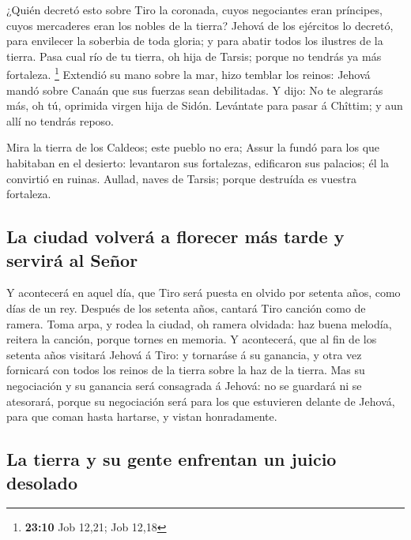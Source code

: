  ¿Quién decretó esto sobre Tiro la coronada, cuyos
negociantes eran príncipes, cuyos mercaderes eran los nobles de la
tierra?  Jehová de los ejércitos lo decretó, para envilecer
la soberbia de toda gloria; y para abatir todos los ilustres de la
tierra.  Pasa cual río de tu tierra, oh hija de Tarsis;
porque no tendrás ya más fortaleza. \footnote{\textbf{23:10} Job 12,21;
  Job 12,18}  Extendió su mano sobre la mar, hizo temblar
los reinos: Jehová mandó sobre Canaán que sus fuerzas sean debilitadas.
 Y dijo: No te alegrarás más, oh tú, oprimida virgen hija
de Sidón. Levántate para pasar á Chîttim; y aun allí no tendrás reposo.

 Mira la tierra de los Caldeos; este pueblo no era; Assur
la fundó para los que habitaban en el desierto: levantaron sus
fortalezas, edificaron sus palacios; él la convirtió en ruinas.
 Aullad, naves de Tarsis; porque destruída es vuestra
fortaleza.

\hypertarget{la-ciudad-volveruxe1-a-florecer-muxe1s-tarde-y-serviruxe1-al-seuxf1or}{%
\subsection{La ciudad volverá a florecer más tarde y servirá al
Señor}\label{la-ciudad-volveruxe1-a-florecer-muxe1s-tarde-y-serviruxe1-al-seuxf1or}}

 Y acontecerá en aquel día, que Tiro será puesta en olvido
por setenta años, como días de un rey. Después de los setenta años,
cantará Tiro canción como de ramera.  Toma arpa, y rodea la
ciudad, oh ramera olvidada: haz buena melodía, reitera la canción,
porque tornes en memoria.  Y acontecerá, que al fin de los
setenta años visitará Jehová á Tiro: y tornaráse á su ganancia, y otra
vez fornicará con todos los reinos de la tierra sobre la haz de la
tierra.  Mas su negociación y su ganancia será consagrada á
Jehová: no se guardará ni se atesorará, porque su negociación será para
los que estuvieren delante de Jehová, para que coman hasta hartarse, y
vistan honradamente.

\hypertarget{la-tierra-y-su-gente-enfrentan-un-juicio-desolado}{%
\subsection{La tierra y su gente enfrentan un juicio
desolado}\label{la-tierra-y-su-gente-enfrentan-un-juicio-desolado}}

